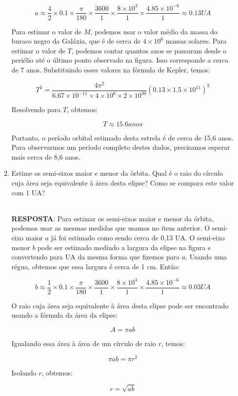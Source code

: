 \documentclass[a4paper,12pt]{article}
\begin{document}
\begin{enumerate}
\begin{enumerate}
$$a \approx \frac{4}{2} \times 0.1 \times \frac{\pi}{180} \times \frac{3600}{1} \times \frac{8 \times 10^3}{1} \times \frac{4.85 \times 10^{-6}}{1} \approx 0.13 UA$$

Para estimar o valor de $M$, podemos usar o valor médio da massa do buraco negro da Galáxia, que é de cerca de $4 \times 10^6$ massas solares. Para estimar o valor de $T$, podemos contar quantos anos se passaram desde o periélio até o último ponto observado na figura. Isso corresponde a cerca de 7 anos. Substituindo esses valores na fórmula de Kepler, temos:

$$T^2 = \frac{4\pi^2}{6.67 \times 10^{-11} \times 4 \times 10^6 \times 2 \times 10^{30}}(0.13 \times 1.5 \times 10^{11})^3$$

Resolvendo para $T$, obtemos:

$$T \approx 15.6 anos$$

Portanto, o período orbital estimado desta estrela é de cerca de 15,6 anos. Para observarmos um período completo destes dados, precisamos esperar mais cerca de 8,6 anos.

\noindent\hrulefill

\item Estime os semi-eixos maior e menor da órbita. Qual é o raio do círculo cuja área seja equivalente à área desta elipse? Como se compara este valor com 1 UA?

\noindent\hrulefill\\\textbf{RESPOSTA}: Para estimar os semi-eixos maior e menor da órbita, podemos usar as mesmas medidas que usamos no item anterior. O semi-eixo maior $a$ já foi estimado como sendo cerca de 0,13 UA. O semi-eixo menor $b$ pode ser estimado medindo a largura da elipse na figura e convertendo para UA da mesma forma que fizemos para $a$. Usando uma régua, obtemos que essa largura é cerca de 1 cm. Então:

$$b \approx \frac{1}{2} \times 0.1 \times \frac{\pi}{180} \times \frac{3600}{1} \times \frac{8 \times 10^3}{1} \times \frac{4.85 \times 10^{-6}}{1} \approx 0.03 UA$$

O raio cuja área seja equivalente à área desta elipse pode ser encontrado usando a fórmula da área da elipse:

$$A = \pi a b$$

Igualando essa área à área de um círculo de raio $r$, temos:

$$\pi a b = \pi r^2$$

Isolando $r$, obtemos:

$$r = \sqrt{a b}$$


\end{enumerate}
\end{enumerate}
\end{document}
